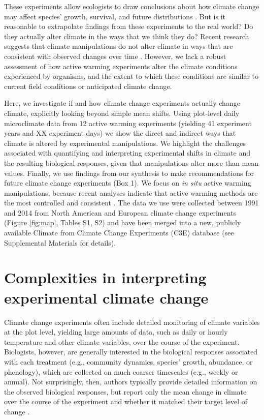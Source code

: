 \documentclass{article}
\begin{document}
\par These experiments allow ecologists to draw conclusions about how climate change may affect species' growth, survival, and future distributions \citep{dukes1999,hobbie1999,morin2010,chuine2012,reich2015,gruner2016}. But is it reasonable to extrapolate findings from these experiments to the real world? Do they actually alter climate in the ways that we think they do? Recent research suggests that climate manipulations do not alter climate in ways that are consistent with observed changes over time \citep{wolkovich2012}. However, we lack a robust assessment of how active warming experiments alter the climate conditions experienced by organisms, and the extent to which these conditions are similar to current field conditions or anticipated climate change. 

\par Here, we investigate if and how climate change experiments actually change climate, explicitly looking beyond simple mean shifts. Using plot-level daily microclimate data from 12 active warming experiments (yielding 41 experiment years and XX experiment days) we show the direct and indirect ways that climate is altered by experimental manipulations. We highlight the challenges associated with quantifying and interpreting experimental shifts in climate and the resulting biological responses, given that manipulations alter more than mean values. Finally, we use findings from our synthesis to make recommendations for future climate change experiments (Box 1). We focus on \textit{in situ} active warming manipulations, because recent analyses indicate that active warming methods are the most controlled and consistent \citep{kimball2005,kimball2008,aronson2009,wolkovich2012}. The data we use were collected between 1991 and 2014 from North American and European climate change experiments (Figure \ref{fig:map}, Tables S1, S2) and have been merged into a new, publicly available Climate from Climate Change Experiments (C3E) database (see Supplemental Materials for details). 

\section* {Complexities in interpreting experimental climate change} 

Climate change experiments often include detailed monitoring of climate variables at the plot level, yielding large amounts of data, such as daily or hourly temperature and other climate variables, over the course of the experiment. Biologists, however, are generally interested in the biological responses associated with each treatment (e.g., community dynamics, species' growth, abundance, or phenology), which are collected on much coarser timescales (e.g., weekly or annual). Not surprisingly, then, authors typically provide detailed information on the observed biological responses, but report only the mean change in climate over the course of the experiment and whether it matched their target level of change \citep[e.g.][]{price1998,clark2014a,clark2014b,rollinson2012}. 
\end{document}
